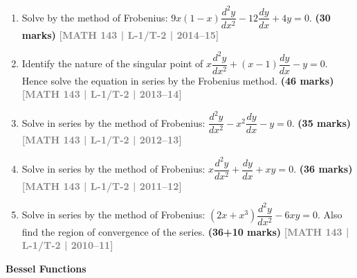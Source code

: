 \documentclass[12pt,a4paper]{article}
\newcommand{\yr}[1]{\hfill\textcolor{gray}{\small\textbf{[#1]}}}
\newcommand{\mk}[1]{\textcolor{orange!70!black}{\small\textbf{(#1 marks)}}}
\newcommand{\subtopic}[2]{%
  \vspace{10pt}
  \noindent\begin{tcolorbox}[colback=#1!8,colframe=#1,boxrule=0.6pt,arc=4pt,
    left=6pt,right=6pt,top=4pt,bottom=4pt]
    \small\bfseries\textcolor{#1}{#2}
  \end{tcolorbox}
  \vspace{2pt}
}
\begin{document}
\begin{enumerate}\item Solve by the method of Frobenius: $9x(1-x)\dfrac{d^{2}y}{dx^{2}}-12\dfrac{dy}{dx}+4y=0$.
\mk{30} \yr{MATH 143 | L-1/T-2 | 2014--15}

\item Identify the nature of the singular point of $x\dfrac{d^{2}y}{dx^{2}}+(x-1)\dfrac{dy}{dx}-y=0$. Hence solve the equation in series by the Frobenius method.
\mk{46\textonehalf} \yr{MATH 143 | L-1/T-2 | 2013--14}

\item Solve in series by the method of Frobenius: $\dfrac{d^{2}y}{dx^{2}}-x^{2}\dfrac{dy}{dx}-y=0$.
\mk{35} \yr{MATH 143 | L-1/T-2 | 2012--13}

\item Solve in series by the method of Frobenius: $x\dfrac{d^{2}y}{dx^{2}}+\dfrac{dy}{dx}+xy=0$.
\mk{36\textonehalf} \yr{MATH 143 | L-1/T-2 | 2011--12}

\item Solve in series by the method of Frobenius: $(2x+x^{3})\dfrac{d^{2}y}{dx^{2}}-6xy=0$. Also find the region of convergence of the series.
\mk{36\textonehalf+10} \yr{MATH 143 | L-1/T-2 | 2010--11}

\end{enumerate}

\subtopic{cI}{Bessel Functions}
\label{sub:s11-bessel}
\end{document}
